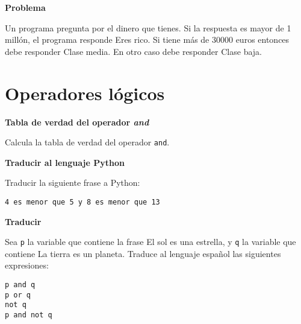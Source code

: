 \documentclass[a4paper, 11pt]{scrartcl}
\newenvironment{code}{\begin{tcolorbox}[colback=red!2!white]}{\end{tcolorbox}}
\begin{document}
\noindent\textbf{\sffamily Problema}

Un programa pregunta por el dinero que tienes. Si la respuesta es mayor de 1 millón, el programa responde \guillemotleft Eres rico\guillemotright. Si tiene más de 30000 euros entonces debe responder \guillemotleft Clase media\guillemotright. En otro caso debe responder \guillemotleft Clase baja\guillemotright.




\newpage


\section{Operadores lógicos}




\noindent\textbf{\sffamily Tabla de verdad del operador \textit{and}}


Calcula la tabla de verdad del operador \verb|and|.





\noindent\textbf{\sffamily Traducir al lenguaje Python}

Traducir la siguiente frase a Python:

\smallskip

\begin{code}

\begin{verbatim}
4 es menor que 5 y 8 es menor que 13
\end{verbatim}

\end{code}





\noindent\textbf{\sffamily Traducir}

Sea \verb|p| la variable que contiene la frase \guillemotleft El sol es una estrella\guillemotright , y \verb|q| la variable que contiene \guillemotleft La tierra es un planeta\guillemotright. Traduce al lenguaje español las siguientes expresiones:

\smallskip

\begin{code}

\begin{verbatim}
p and q
p or q
not q
p and not q
\end{verbatim}

\end{code}
\end{document}
